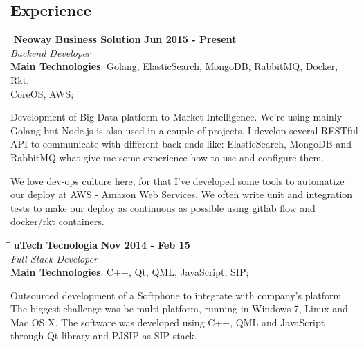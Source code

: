 \documentclass[margin]{res}
\begin{document}
\begin{resume}
\section{Experience}
\vspace{-0.1in}
    \begin{tabbing}
    \hspace{2.3in}\= \hspace{1.7in}\= \kill %
    \textbf{Neoway Business Solution}    \>\>\textbf{Jun 2015 - Present}\\
    \textit{Backend Developer}\\
    \textbf{Main Technologies}: Golang, ElasticSearch, MongoDB, RabbitMQ, Docker, Rkt,\\CoreOS, AWS;
    \end{tabbing}\vspace{-20pt}      %
    \vspace{2mm}
Development of Big Data platform to Market Intelligence. We're using mainly Golang but Node.js is also used in a couple of projects. I develop several RESTful API to communicate with different back-ends like: ElasticSearch, MongoDB and RabbitMQ what give me some experience how to use and configure them. 

We love dev-ops culture here, for that I've developed some tools to automatize our deploy at AWS - Amazon Web Services. We often write unit and integration tests to make our deploy as continuous as possible using gitlab flow and docker/rkt containers.

\vspace{-0.1in}
    \begin{tabbing}
    \hspace{2.3in}\= \hspace{1.7in}\= \kill
    \textbf{uTech Tecnologia}    \>\>\textbf{Nov 2014 - Feb 15}\\
    \textit{Full Stack Developer}\\
    \textbf{Main Technologies}: C++, Qt, QML, JavaScript, SIP;
    \end{tabbing}\vspace{-20pt}
    \vspace{2mm}
Outsourced development of a Softphone to integrate with company’s platform. The biggest challenge was be multi-platform, running in Windows 7, Linux and Mac OS X. The software was developed using C++, QML and JavaScript through Qt library and PJSIP as SIP stack.    


\end{resume}
\end{document}
